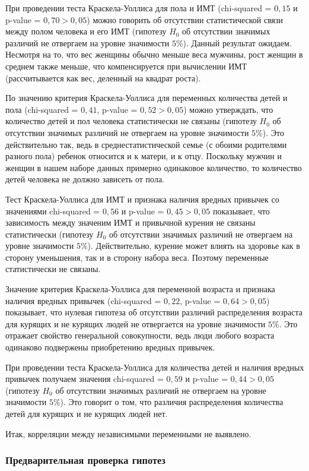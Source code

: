 \documentclass[a4paper,12pt]{article}
\begin{document}
При проведении теста Краскела-Уоллиса для пола и ИМТ (chi-squared = $0,15$ и p-value = $0,70 > 0,05$) можно говорить об отсутствии статистической связи между полом человека и его ИМТ (гипотезу $H_0$ об отсутствии значимых различий не отвергаем на уровне значимости $5\%$). Данный результат ожидаем. Несмотря на то, что вес женщины обычно меньше веса мужчины, рост женщин в среднем также меньше, что компенсируется при вычислении ИМТ (рассчитывается как вес, деленный на квадрат роста).

По значению критерия Краскела-Уоллиса для переменных количества детей и пола (chi-squared = $0,41$,  p-value = $0,52 > 0,05$) можно утверждать, что количество детей и пол человека статистически не связаны (гипотезу $H_0$ об отсутствии значимых различий не отвергаем на уровне значимости $5\%$). Это действительно так, ведь в среднестатистической семье (с обоими родителями разного пола) ребенок относится и к матери, и к отцу. Поскольку мужчин и женщин в нашем наборе данных примерно одинаковое количество, то количество детей человека не должно зависеть от пола.

Тест Краскела-Уоллиса для ИМТ и признака наличия вредных привычек со значениями chi-squared = $0,56$ и p-value = $0,45 > 0,05$ показывает, что зависимость между значеним ИМТ и привычной курения не связаны статистически (гипотезу $H_0$ об отсутствии значимых различий не отвергаем на уровне значимости $5\%$). Действительно, курение может влиять на здоровье как в сторону уменьшения, так и в сторону набора веса. Поэтому переменные статистически не связаны.

Значение критерия Краскела-Уоллиса для переменной возраста и признака наличия вредных привычек (chi-squared = $0,22$, p-value = $0,64 > 0,05$) показывает, что нулевая гипотеза об отсутствии различий распределения возраста для курящих и не курящих людей не отвергается на уровне значимости $5\%$. Это отражает свойство генеральной совокупности, ведь люди любого возраста одинаково подвержены приобретению вредных привычек.

При проведении теста Краскела-Уоллиса для количества детей и наличия вредных привычек получаем значения chi-squared = $0,59$ и p-value = $0,44 > 0,05$ (гипотезу $H_0$ об отсутствии значимых различий не отвергаем на уровне значимости $5\%$). Это говорит о том, что различия распределения количества детей для курящих и не курящих людей нет.

Итак, корреляции между независимыми переменными не выявлено.

\subsubsection{Предварительная проверка гипотез}
\end{document}
